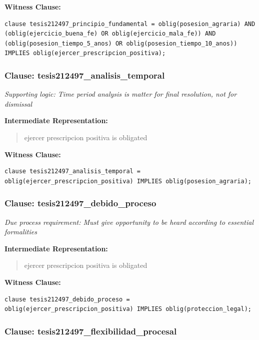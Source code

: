 \documentclass[11pt,a4paper]{article}
\begin{document}
\textbf{Witness Clause:}

\begin{lstlisting}[style=witnessstyle, language=Witness]
clause tesis212497_principio_fundamental = oblig(posesion_agraria) AND (oblig(ejercicio_buena_fe) OR oblig(ejercicio_mala_fe)) AND (oblig(posesion_tiempo_5_anos) OR oblig(posesion_tiempo_10_anos)) IMPLIES oblig(ejercer_prescripcion_positiva);
\end{lstlisting}

\subsubsection{Clause: tesis212497\_analisis\_temporal}

\textit{Supporting logic: Time period analysis is matter for final resolution, not for dismissal}

\textbf{Intermediate Representation:}

\begin{quote}
ejercer prescripcion positiva is obligated
\end{quote}

\textbf{Witness Clause:}

\begin{lstlisting}[style=witnessstyle, language=Witness]
clause tesis212497_analisis_temporal = oblig(ejercer_prescripcion_positiva) IMPLIES oblig(posesion_agraria);
\end{lstlisting}

\subsubsection{Clause: tesis212497\_debido\_proceso}

\textit{Due process requirement: Must give opportunity to be heard according to essential formalities}

\textbf{Intermediate Representation:}

\begin{quote}
ejercer prescripcion positiva is obligated
\end{quote}

\textbf{Witness Clause:}

\begin{lstlisting}[style=witnessstyle, language=Witness]
clause tesis212497_debido_proceso = oblig(ejercer_prescripcion_positiva) IMPLIES oblig(proteccion_legal);
\end{lstlisting}

\subsubsection{Clause: tesis212497\_flexibilidad\_procesal}
\end{document}

